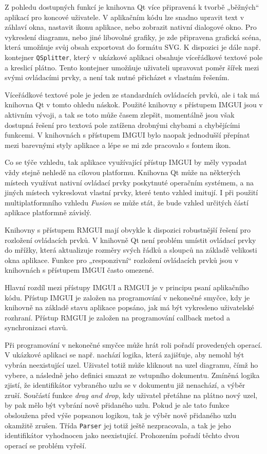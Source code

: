 \documentclass[FM,DP]{tulthesis}
\begin{document}
	Z pohledu dostupných funkcí je knihovna Qt více připravená k tvorbě „běžných“ aplikací pro koncové uživatele. V aplikačním kódu lze snadno upravit text v záhlaví okna, nastavit ikonu aplikace, nebo zobrazit nativní dialogové okno. Pro vykreslení diagramu, nebo jiné libovolné grafiky, je zde připravena grafická scéna, která \mbox{umožňuje} svůj obsah exportovat do formátu SVG. K dispozici je dále např. kontejner \texttt{QSplitter}, který v ukázkové aplikaci obsahuje víceřádkové textové pole a kreslicí plátno. Tento kontejner umožňuje uživateli upravovat poměr šířek mezi svými ovládacími prvky, a není tak nutné přicházet s vlastním řešením.
	
	Víceřádkové textové pole je jeden ze standardních ovládacích prvků, ale i tak má knihovna Qt v tomto ohledu náskok. Použité knihovny s přístupem IMGUI jsou v aktivním vývoji, a tak se toto může časem zlepšit, momentálně jsou však dostupná řešení pro textová pole zatížena drobnými chybami a chybějícími funkcemi. V knihovnách s přístupem IMGUI bylo naopak jednodušší přepínat mezi barevnými styly aplikace a lépe se mi zde pracovalo s fontem ikon.
	
	Co se týče vzhledu, tak aplikace využívající přístup IMGUI by měly vypadat vždy stejně nehledě na cílovou platformu. Knihovna Qt může na některých místech využívat nativní ovládací prvky poskytnuté operačním systémem, a na jiných místech vykreslovat vlastní prvky, které tento vzhled imitují. I při použití multiplatformního vzhledu \textit{Fusion} se může stát, že bude vzhled určitých částí aplikace platformně závislý.

	Knihovny s přístupem RMGUI mají obvykle k dispozici robustnější řešení pro rozložení ovládacích prvků. V knihovně Qt není problém umístit ovládací prvky do mřížky, která aktualizuje rozměry svých řádků a sloupců na základě velikosti okna aplikace. Funkce pro „responzivní“ rozložení ovládacích prvků jsou v knihovnách s přístupem IMGUI často omezené.		

	Hlavní rozdíl mezi přístupy IMGUI a RMGUI je v principu psaní aplikačního kódu. Přístup IMGUI je založen na programování v nekonečné smyčce, kdy je knihovně na základě stavu aplikace popsáno, jak má být vykresleno uživatelské rozhraní. Přístup RMGUI je založen na programování callback metod a synchronizaci stavů.
	
	Při programování v nekonečné smyčce může hrát roli pořadí provedených operací. V ukázkové aplikaci se např. nachází logika, která zajišťuje, aby nemohl být vybrán neexistující uzel. Uživatel totiž může kliknout na uzel diagramu, čímž ho vybere, a následně jeho definici smazat ze vstupního dokumentu. Zmíněná logika zjistí, že identifikátor vybraného uzlu se v dokumentu  již nenachází, a výběr zruší. Součástí funkce \textit{drag and drop}, kdy uživatel přetáhne na plátno nový uzel, by pak mělo být vybrání nově přidaného uzlu. Pokud je ale tato funkce obsloužena před výše popsanou logikou, tak je výběr nově přidaného uzlu okamžitě zrušen. Třída \texttt{Parser} jej totiž ještě nezpracovala, a tak je jeho identifikátor vyhodnocen jako neexistující. Prohozením pořadí těchto dvou operací se problém vyřeší.	
	
\end{document}
